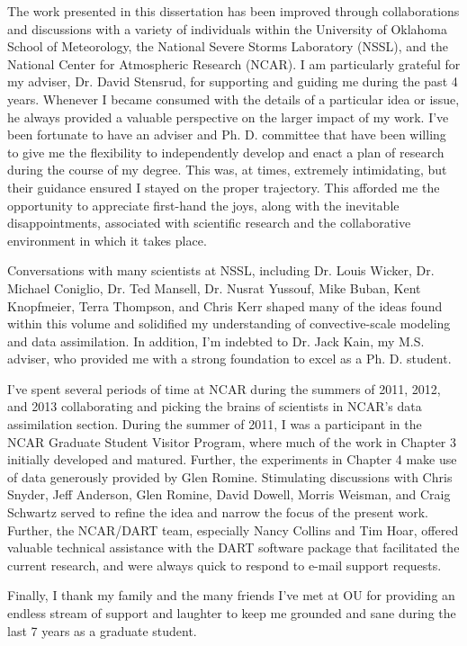 \begin{preface}
The work presented in this dissertation has been improved through  collaborations and discussions with a variety of individuals within the University of Oklahoma School of Meteorology, the National Severe Storms Laboratory (NSSL), and the National Center for Atmospheric Research (NCAR). I am particularly grateful for my adviser, Dr. David Stensrud, for supporting and guiding me during the past 4 years. Whenever I became consumed with the details of a particular idea or issue, he always provided a valuable perspective on the larger impact of my work. I've been fortunate to have an adviser and Ph. D. committee that have been willing to give me the flexibility to independently develop and enact a plan of research during the course of my degree. This was, at times, extremely intimidating, but their guidance ensured I stayed on the proper trajectory. This afforded me the opportunity to appreciate first-hand the joys, along with the inevitable disappointments, associated with scientific research and the collaborative environment in which it takes place.

Conversations with many scientists at NSSL, including Dr. Louis Wicker, Dr. Michael Coniglio, Dr. Ted Mansell, Dr. Nusrat Yussouf, Mike Buban, Kent Knopfmeier, Terra Thompson, and Chris Kerr shaped many of the ideas found within this volume and solidified my understanding of convective-scale modeling and data assimilation. In addition, I'm indebted to Dr. Jack Kain, my M.S. adviser, who provided me with a strong foundation to excel as a Ph. D. student.

I've spent several periods of time at NCAR during the summers of 2011, 2012, and 2013 collaborating and picking the brains of scientists in NCAR's data assimilation section. During the summer of 2011, I was a participant in the NCAR Graduate Student Visitor Program, where much of the work in Chapter 3 initially developed and matured. Further, the experiments in Chapter 4 make use of data generously provided by Glen Romine. Stimulating discussions with Chris Snyder, Jeff Anderson, Glen Romine, David Dowell, Morris Weisman, and Craig Schwartz served to refine the idea and narrow the focus of the present work. Further, the NCAR/DART team, especially Nancy Collins and Tim Hoar, offered valuable technical assistance with the DART software package that facilitated the current research, and were always quick to respond to e-mail support requests.

Finally, I thank my family and the many friends I've met at OU for providing an endless stream of support and laughter to keep me grounded and sane during the last 7 years as a graduate student.


\end{preface}
